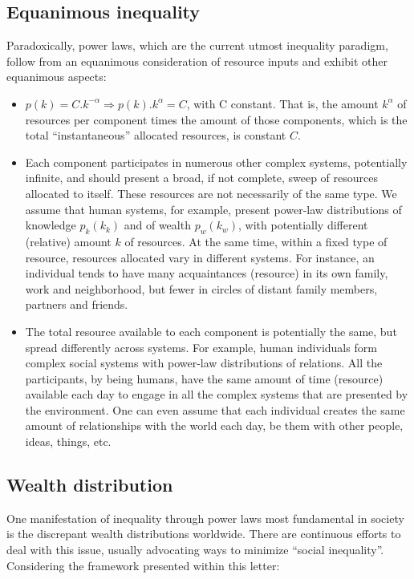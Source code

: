 \documentclass[a4paper, 11pt]{article} %
\begin{document}
\subsection{Equanimous inequality}
Paradoxically, power laws, which are the 
current utmost inequality paradigm,
follow from an equanimous consideration
of resource inputs
and exhibit other equanimous aspects:
\begin{itemize}
	\item $p(k)=C.k^{-\alpha} \Rightarrow p(k).k^{\alpha}=C$, with C constant. That is, the amount $k^\alpha$ of resources per component times the amount of those components, which is the total ``instantaneous'' allocated resources, is constant $C$.
	\item Each component participates in numerous other complex systems, potentially infinite, and should present a broad, if not complete, sweep of resources allocated to itself.
		These resources are not necessarily of the same type. We assume that human systems, for example, present power-law distributions of knowledge $p_k(k_k)$ and of wealth $p_w(k_w)$, with potentially different (relative) amount $k$ of resources. At the same time, within a fixed type of resource, resources allocated vary in different systems. For instance, an individual tends to have many acquaintances (resource) in its own family, work and neighborhood, but fewer in circles of distant family members, partners and friends.
	\item The total resource available to each component is potentially the same, but spread differently across systems. For example, human individuals form complex social systems with power-law distributions of relations. All the participants, by being humans, have the same amount of time (resource) available each day to engage in all the complex systems that are presented by the environment. One can even assume that each individual creates the same amount of relationships with the world each day, be them with other people, ideas, things, etc. 
\end{itemize}


\subsection{Wealth distribution}
One manifestation of inequality through power laws
most fundamental in society is the discrepant wealth distributions worldwide. There are continuous efforts to deal with this issue,
usually advocating ways to minimize ``social inequality''.
Considering the framework presented within this letter:
\end{document}
